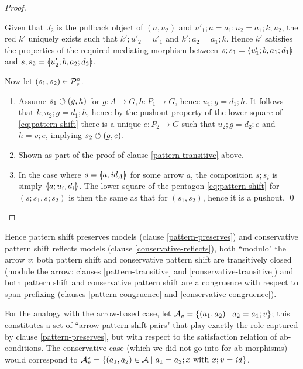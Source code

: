 \begin{proof}
\begin{enumerate}[topsep=\smallskipamount]
\begin{center}
\end{center}
%
Given that $J_2$ is the pullback object of $(a,u_2)$ and $u'_1;a=a_1;u_2=a_1;k;u_2$, the red $k'$ uniquely exists such that $k';u'_2=u'_1$ and $k';a_2=a_1;k$. Hence $k'$ satisfies the properties of the required mediating morphism between $s;s_1=\spanof{u'_1;b}{a_1;d_1}$ and $s;s_2=\spanof{u'_2;b}{a_2;d_2}$.
\end{enumerate}
%
Now let $(s_1,s_2)\in \mathcal{P}^\circ_v$.
%
\begin{enumerate}[resume,topsep=\smallskipamount]
\item Assume $s_1\circlearrowleft (g,h)$ for $g:A\to G,h:P_1\to G$, hence $u_1;g=d_1;h$. It follows that $k;u_2;g=d_1;h$, hence by the pushout property of the lower square of \eqref{eq:pattern shift} there is a unique $e:P_2\to G$ such that $u_2;g=d_2;e$ and $h=v;e$, implying $s_2\circlearrowleft (g,e)$.

\item Shown as part of the proof of clause \ref{pattern-transitive} above.

\item In the case where $s=\spanof{a}{\id_A}$ for some arrow $a$, the composition $s;s_i$ is simply $\spanof{a;u_i}{d_i}$. The lower square of the pentagon \eqref{eq:pattern shift} for $(s;s_1,s;s_2)$ is then the same as that for $(s_1,s_2)$, hence it is a pushout.
\qed
\end{enumerate}
\end{proof}
%
Hence pattern shift preserves models (clause \ref{pattern-preserves}) and conservative pattern shift reflects models (clause \ref{conservative-reflects}), both ``modulo" the arrow $v$; both pattern shift and conservative pattern shift are transitively closed (module the arrow: clauses \ref{pattern-transitive} and \ref{conservative-transitive}) and both pattern shift and conservative pattern shift are a congruence with respect to span prefixing (clauses \ref{pattern-congruence} and \ref{conservative-congruence}).

For the analogy with the arrow-based case, let $\mathcal{A}_v=\{{(a_1,a_2)\mid a_2=a_1;v}\}$; this constitutes a set of ``arrow pattern shift pairs" that play exactly the role captured by clause \ref{pattern-preserves}, but with respect to the satisfaction relation of ab-conditions. The conservative case (which we did not go into for ab-morphisms) would correspond to $\mathcal{A}^\circ_v=\{{(a_1,a_2)\in \mathcal{A}\mid a_1=a_2;x \text{ with } x;v=\mathit{id}}\}$.

